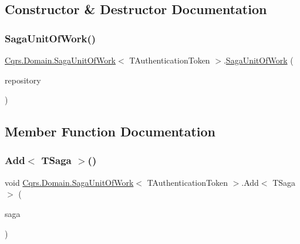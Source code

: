 \subsection{Constructor \& Destructor Documentation}
\mbox{\label{classCqrs_1_1Domain_1_1SagaUnitOfWork_ae2340d3bc97745c71d4854cb24115e93_ae2340d3bc97745c71d4854cb24115e93}} 
\subsubsection{\texorpdfstring{Saga\+Unit\+Of\+Work()}{SagaUnitOfWork()}}
{\footnotesize\ttfamily \hyperlink{classCqrs_1_1Domain_1_1SagaUnitOfWork}{Cqrs.\+Domain.\+Saga\+Unit\+Of\+Work}$<$ T\+Authentication\+Token $>$.\hyperlink{classCqrs_1_1Domain_1_1SagaUnitOfWork}{Saga\+Unit\+Of\+Work} (\begin{DoxyParamCaption}\item[{\hyperlink{interfaceCqrs_1_1Domain_1_1ISagaRepository}{I\+Saga\+Repository}$<$ T\+Authentication\+Token $>$}]{repository }\end{DoxyParamCaption})}



\subsection{Member Function Documentation}
\mbox{\label{classCqrs_1_1Domain_1_1SagaUnitOfWork_af62fee98e76ec58ec4d684b36eb7b20e_af62fee98e76ec58ec4d684b36eb7b20e}} 
\subsubsection{\texorpdfstring{Add$<$ T\+Saga $>$()}{Add< TSaga >()}}
{\footnotesize\ttfamily void \hyperlink{classCqrs_1_1Domain_1_1SagaUnitOfWork}{Cqrs.\+Domain.\+Saga\+Unit\+Of\+Work}$<$ T\+Authentication\+Token $>$.Add$<$ T\+Saga $>$ (\begin{DoxyParamCaption}\item[{T\+Saga}]{saga }\end{DoxyParamCaption})}



